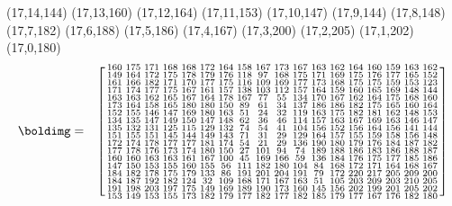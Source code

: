 (17,14,144) (17,13,160) (17,12,164) (17,11,153) (17,10,147) (17,9,144) (17,8,148) (17,7,182) (17,6,188) (17,5,186) (17,4,167) (17,3,200) (17,2,205) (17,1,202) (17,0,180)
%
%
\[
	\begin{array}{cc}
		\boldimg = &
		\left[
			\begin{smallmatrix} 160 & 175 & 171 & 168 & 168 & 172 & 164 & 158 & 167 & 173 & 167 & 163 & 162 & 164 & 160 & 159 & 163 & 162\\ 149 & 164 & 172 & 175 & 178 & 179 & 176 & 118 & 97 & 168 & 175 & 171 & 169 & 175 & 176 & 177 & 165 & 152\\ 161 & 166 & 182 & 171 & 170 & 177 & 175 & 116 & 109 & 169 & 177 & 173 & 168 & 175 & 175 & 159 & 153 & 123\\ 171 & 174 & 177 & 175 & 167 & 161 & 157 & 138 & 103 & 112 & 157 & 164 & 159 & 160 & 165 & 169 & 148 & 144\\ 163 & 163 & 162 & 165 & 167 & 164 & 178 & 167 & 77 & 55 & 134 & 170 & 167 & 162 & 164 & 175 & 168 & 160\\ 173 & 164 & 158 & 165 & 180 & 180 & 150 & 89 & 61 & 34 & 137 & 186 & 186 & 182 & 175 & 165 & 160 & 164\\ 152 & 155 & 146 & 147 & 169 & 180 & 163 & 51 & 24 & 32 & 119 & 163 & 175 & 182 & 181 & 162 & 148 & 153\\ 134 & 135 & 147 & 149 & 150 & 147 & 148 & 62 & 36 & 46 & 114 & 157 & 163 & 167 & 169 & 163 & 146 & 147\\ 135 & 132 & 131 & 125 & 115 & 129 & 132 & 74 & 54 & 41 & 104 & 156 & 152 & 156 & 164 & 156 & 141 & 144\\ 151 & 155 & 151 & 145 & 144 & 149 & 143 & 71 & 31 & 29 & 129 & 164 & 157 & 155 & 159 & 158 & 156 & 148\\ 172 & 174 & 178 & 177 & 177 & 181 & 174 & 54 & 21 & 29 & 136 & 190 & 180 & 179 & 176 & 184 & 187 & 182\\ 177 & 178 & 176 & 173 & 174 & 180 & 150 & 27 & 101 & 94 & 74 & 189 & 188 & 186 & 183 & 186 & 188 & 187\\ 160 & 160 & 163 & 163 & 161 & 167 & 100 & 45 & 169 & 166 & 59 & 136 & 184 & 176 & 175 & 177 & 185 & 186\\ 147 & 150 & 153 & 155 & 160 & 155 & 56 & 111 & 182 & 180 & 104 & 84 & 168 & 172 & 171 & 164 & 168 & 167\\ 184 & 182 & 178 & 175 & 179 & 133 & 86 & 191 & 201 & 204 & 191 & 79 & 172 & 220 & 217 & 205 & 209 & 200\\ 184 & 187 & 192 & 182 & 124 & 32 & 109 & 168 & 171 & 167 & 163 & 51 & 105 & 203 & 209 & 203 & 210 & 205\\ 191 & 198 & 203 & 197 & 175 & 149 & 169 & 189 & 190 & 173 & 160 & 145 & 156 & 202 & 199 & 201 & 205 & 202\\ 153 & 149 & 153 & 155 & 173 & 182 & 179 & 177 & 182 & 177 & 182 & 185 & 179 & 177 & 167 & 176 & 182 & 180 \end{smallmatrix}\right]

\end{array}\]
